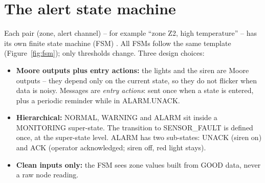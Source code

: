 \documentclass[11pt,a4paper]{report}
\begin{document}
\section{The alert state machine}
Each pair (zone, alert channel) -- for example ``zone Z2, high temperature'' -- has its own finite state machine (FSM) \cite{lec}. All FSMs follow the same template (Figure~\ref{fig:fsm}); only thresholds change. Three design choices:
\begin{itemize}
  \item \textbf{Moore outputs plus entry actions:} the lights and the siren are Moore outputs -- they depend only on the current state, so they do not flicker when data is noisy. Messages are \emph{entry actions}: sent once when a state is entered, plus a periodic reminder while in ALARM.UNACK.
  \item \textbf{Hierarchical:} NORMAL, WARNING and ALARM sit inside a MONITORING super-state. The transition to SENSOR\_FAULT is defined once, at the super-state level. ALARM has two sub-states: UNACK (siren on) and ACK (operator acknowledged; siren off, red light stays).
  \item \textbf{Clean inputs only:} the FSM sees zone values built from GOOD data, never a raw node reading.
\end{itemize}
\end{document}
